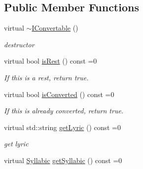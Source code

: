 \subsection*{\-Public \-Member \-Functions}
\begin{DoxyCompactItemize}
\item 
\hypertarget{classsinsy_1_1IConvertable_ab66b261751f1e6843d5b7fc455b28ad6}{virtual \hyperlink{classsinsy_1_1IConvertable_ab66b261751f1e6843d5b7fc455b28ad6}{$\sim$\-I\-Convertable} ()}\label{classsinsy_1_1IConvertable_ab66b261751f1e6843d5b7fc455b28ad6}

\begin{DoxyCompactList}\small\item\em destructor \end{DoxyCompactList}\item 
\hypertarget{classsinsy_1_1IConvertable_a04aad16eb0150451a0265f07b6668c11}{virtual bool \hyperlink{classsinsy_1_1IConvertable_a04aad16eb0150451a0265f07b6668c11}{is\-Rest} () const =0}\label{classsinsy_1_1IConvertable_a04aad16eb0150451a0265f07b6668c11}

\begin{DoxyCompactList}\small\item\em \-If this is a rest, return true. \end{DoxyCompactList}\item 
\hypertarget{classsinsy_1_1IConvertable_a381d85f5055f01b7468f0541701e9b1f}{virtual bool \hyperlink{classsinsy_1_1IConvertable_a381d85f5055f01b7468f0541701e9b1f}{is\-Converted} () const =0}\label{classsinsy_1_1IConvertable_a381d85f5055f01b7468f0541701e9b1f}

\begin{DoxyCompactList}\small\item\em \-If this is already converted, return true. \end{DoxyCompactList}\item 
\hypertarget{classsinsy_1_1IConvertable_ab3bc6bf5cf525605844d2f9b3635d30d}{virtual std\-::string \hyperlink{classsinsy_1_1IConvertable_ab3bc6bf5cf525605844d2f9b3635d30d}{get\-Lyric} () const =0}\label{classsinsy_1_1IConvertable_ab3bc6bf5cf525605844d2f9b3635d30d}

\begin{DoxyCompactList}\small\item\em get lyric \end{DoxyCompactList}\item 
\hypertarget{classsinsy_1_1IConvertable_ad4df340bc95b0af3003b680eee25ed0d}{virtual \hyperlink{classsinsy_1_1Syllabic}{\-Syllabic} \hyperlink{classsinsy_1_1IConvertable_ad4df340bc95b0af3003b680eee25ed0d}{get\-Syllabic} () const =0}\label{classsinsy_1_1IConvertable_ad4df340bc95b0af3003b680eee25ed0d}


\end{DoxyCompactItemize}
